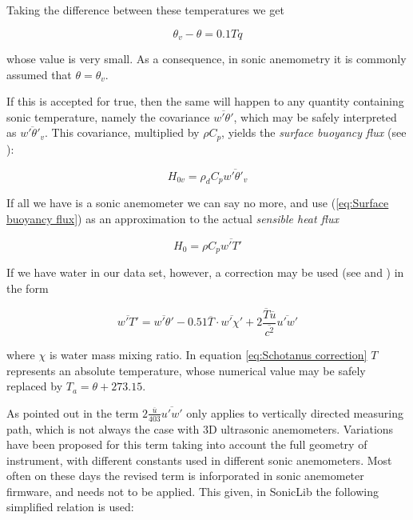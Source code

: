 \documentclass[a4paper,10pt]{book}
\begin{document}
Taking the difference between these temperatures we get

\begin{equation}\label{eq:Difference between virtual anc sonic temperatures}
 \theta_{v} - \theta = 0.1 Tq
\end{equation} 

\noindent whose value is very small. As a consequence, in sonic anemometry it is commonly assumed that $\theta = \theta_{v}$.

If this is accepted for true, then the same will happen to any quantity containing sonic temperature, namely the covariance $\overline{w'\theta'}$, which may be safely interpreted as $\overline{w'\theta'_{v}}$. This covariance, multiplied by $\rho C_{p}$, yields the \emph{surface buoyancy flux} (see \cite{Garratt1992}):

\begin{equation}\label{eq:Surface buoyancy flux}
 H_{0v} = \rho_{d} C_{p} \overline{w'\theta'_{v}}
\end{equation} 

If all we have is a sonic anemometer we can say no more, and use (\ref{eq:Surface buoyancy flux}) as an approximation to the actual \emph{sensible heat flux}

\begin{equation}\label{eq:Sensible heat flux}
 H_{0} = \rho C_{p} \overline{w'T'}
\end{equation} 

If we have water in our data set, however, a correction may be used (see \cite{Schotanus1983} and \cite{Sozzi2002}) in the form

\begin{equation}\label{eq:Schotanus correction}
 \overline{w'T'} = \overline{w'\theta'} - 
    0.51 \overline{T} \cdot \overline{w'\chi'} + 
    2 \frac{\overline{T} \overline{u}}{\overline{c^{2}}} \overline{u'w'}
\end{equation} 

\noindent where $\chi$ is water mass mixing ratio. In equation \ref{eq:Schotanus correction} $T$ represents an absolute temperature, whose numerical value may be safely replaced by $T_{a} = \theta + 273.15$.

As pointed out in \cite{Foken2008} the term $2 \frac{\overline{u}}{403} \overline{u'w'}$ only applies to vertically directed measuring path, which is not always the case with 3D ultrasonic anemometers. Variations have been proposed for this term taking into account the full geometry of instrument, with different constants used in different sonic anemometers. Most often on these days the revised term is inforporated in sonic anemometer firmware, and needs not to be applied. This given, in SonicLib the following simplified relation is used: 
\end{document}
